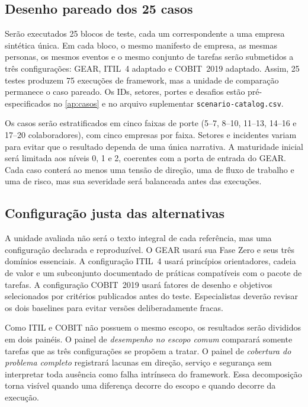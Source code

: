 \subsection{Desenho pareado dos 25 casos}

Serão executados 25 blocos de teste, cada um correspondente a uma empresa sintética única. Em cada bloco, o mesmo manifesto de empresa, as mesmas personas, os mesmos eventos e o mesmo conjunto de tarefas serão submetidos a três configurações: GEAR, ITIL~4 adaptado e COBIT~2019 adaptado. Assim, 25 testes produzem 75 execuções de framework, mas a unidade de comparação permanece o caso pareado. Os IDs, setores, portes e desafios estão pré-especificados no \cref{ap:casos} e no arquivo suplementar \texttt{scenario-catalog.csv}.

Os casos serão estratificados em cinco faixas de porte (5--7, 8--10, 11--13, 14--16 e 17--20 colaboradores), com cinco empresas por faixa. Setores e incidentes variam para evitar que o resultado dependa de uma única narrativa. A maturidade inicial será limitada aos níveis 0, 1 e 2, coerentes com a porta de entrada do GEAR. Cada caso conterá ao menos uma tensão de direção, uma de fluxo de trabalho e uma de risco, mas sua severidade será balanceada antes das execuções.

\subsection{Configuração justa das alternativas}

A unidade avaliada não será o texto integral de cada referência, mas uma configuração declarada e reproduzível. O GEAR usará sua Fase Zero e seus três domínios essenciais. A configuração ITIL~4 usará princípios orientadores, cadeia de valor e um subconjunto documentado de práticas compatíveis com o pacote de tarefas. A configuração COBIT~2019 usará fatores de desenho e objetivos selecionados por critérios publicados antes do teste. Especialistas deverão revisar os dois baselines para evitar versões deliberadamente fracas.

Como ITIL e COBIT não possuem o mesmo escopo, os resultados serão divididos em dois painéis. O painel de \emph{desempenho no escopo comum} comparará somente tarefas que as três configurações se propõem a tratar. O painel de \emph{cobertura do problema completo} registrará lacunas em direção, serviço e segurança sem interpretar toda ausência como falha intrínseca do framework. Essa decomposição torna visível quando uma diferença decorre do escopo e quando decorre da execução.

